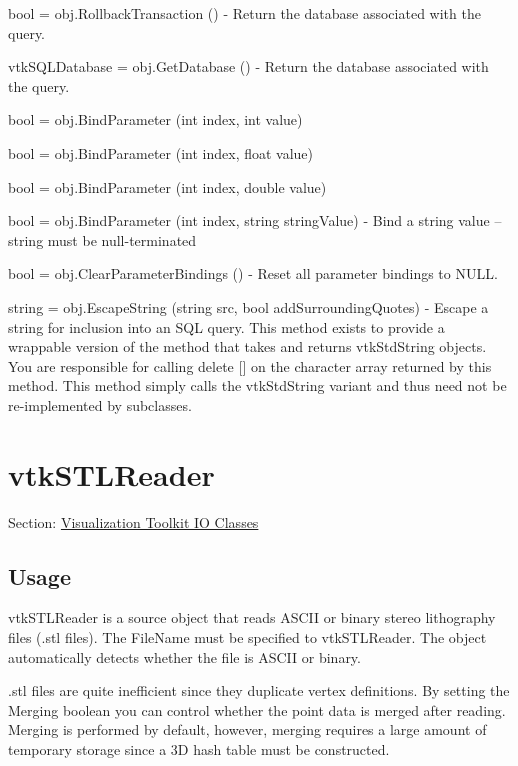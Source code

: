 \begin{DoxyItemize}
\item {\ttfamily bool = obj.\-Rollback\-Transaction ()} -\/ Return the database associated with the query.  
\item {\ttfamily vtk\-S\-Q\-L\-Database = obj.\-Get\-Database ()} -\/ Return the database associated with the query.  
\item {\ttfamily bool = obj.\-Bind\-Parameter (int index, int value)}  
\item {\ttfamily bool = obj.\-Bind\-Parameter (int index, float value)}  
\item {\ttfamily bool = obj.\-Bind\-Parameter (int index, double value)}  
\item {\ttfamily bool = obj.\-Bind\-Parameter (int index, string string\-Value)} -\/ Bind a string value -- string must be null-\/terminated  
\item {\ttfamily bool = obj.\-Clear\-Parameter\-Bindings ()} -\/ Reset all parameter bindings to N\-U\-L\-L.  
\item {\ttfamily string = obj.\-Escape\-String (string src, bool add\-Surrounding\-Quotes)} -\/ Escape a string for inclusion into an S\-Q\-L query. This method exists to provide a wrappable version of the method that takes and returns vtk\-Std\-String objects. You are responsible for calling delete \mbox{[}\mbox{]} on the character array returned by this method. This method simply calls the vtk\-Std\-String variant and thus need not be re-\/implemented by subclasses.  
\end{DoxyItemize}\hypertarget{vtkio_vtkstlreader}{}\section{vtk\-S\-T\-L\-Reader}\label{vtkio_vtkstlreader}
Section\-: \hyperlink{sec_vtkio}{Visualization Toolkit I\-O Classes} \hypertarget{vtkwidgets_vtkxyplotwidget_Usage}{}\subsection{Usage}\label{vtkwidgets_vtkxyplotwidget_Usage}
vtk\-S\-T\-L\-Reader is a source object that reads A\-S\-C\-I\-I or binary stereo lithography files (.stl files). The File\-Name must be specified to vtk\-S\-T\-L\-Reader. The object automatically detects whether the file is A\-S\-C\-I\-I or binary.

.stl files are quite inefficient since they duplicate vertex definitions. By setting the Merging boolean you can control whether the point data is merged after reading. Merging is performed by default, however, merging requires a large amount of temporary storage since a 3\-D hash table must be constructed.

